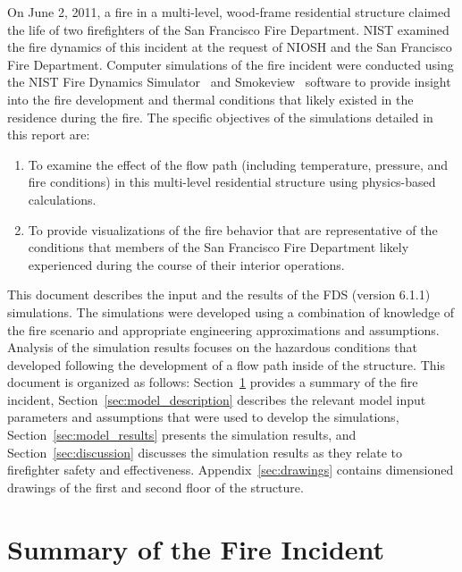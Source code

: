 \documentclass[12pt,oneside]{book}
\begin{document}
On June 2, 2011, a fire in a multi-level, wood-frame residential structure claimed the life of two firefighters of the San Francisco Fire Department. NIST examined the fire dynamics of this incident at the request of NIOSH and the San Francisco Fire Department. Computer simulations of the fire incident were conducted using the NIST Fire Dynamics Simulator~\cite{FDS_Users_Guide} and Smokeview~\cite{Smokeview_Users_Guide} software to provide insight into the fire development and thermal conditions that likely existed in the residence during the fire. The specific objectives of the simulations detailed in this report are: 
\begin{enumerate}
\item To examine the effect of the flow path (including temperature, pressure, and fire conditions) in this multi-level residential structure using physics-based calculations.
\item To provide visualizations of the fire behavior that are representative of the conditions that members of the San Francisco Fire Department likely experienced during the course of their interior operations.
\end{enumerate}
This document describes the input and the results of the FDS (version 6.1.1) simulations. The simulations were developed using a combination of knowledge of the fire scenario and appropriate engineering approximations and assumptions. Analysis of the simulation results focuses on the hazardous conditions that developed following the development of a flow path inside of the structure. This document is organized as follows: Section~\ref{sec:incident_summary} provides a summary of the fire incident, Section~\ref{sec:model_description} describes the relevant model input parameters and assumptions that were used to develop the simulations, Section~\ref{sec:model_results} presents the simulation results, and Section~\ref{sec:discussion} discusses the simulation results as they relate to firefighter safety and effectiveness. Appendix~\ref{sec:drawings} contains dimensioned drawings of the first and second floor of the structure.


\chapter{Summary of the Fire Incident}
\label{sec:incident_summary}
\end{document}
